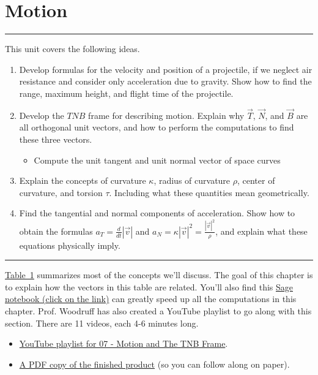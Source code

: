 \documentclass[10pt,]{book}
\theoremstyle{plain}
\theoremstyle{definition}
\theoremstyle{definition}
\theoremstyle{definition}
\theoremstyle{definition}
\newenvironment{objectives}[1]{\noindent\rule{\linewidth}{0.1ex}\newline{\textbf{{\large#1}}\par\smallskip}}{\par\noindent\rule{\linewidth}{0.1ex}\par\smallskip}
\theoremstyle{definition}
\numberwithin{equation}{section}
\newcommand{\sageurlforcurvature}{http://bmw.byuimath.com/dokuwiki/doku.php?id=curvature_calculator}
\begin{document}
\chapter[{Motion}]{Motion}\label{chapter-8}
\begin{objectives}{Objectives}\label{objectives-16}
This unit covers the following ideas.%
%
\begin{enumerate}
\item\hypertarget{li-105}{}Develop formulas for the velocity and position of a projectile, if we neglect air resistance and consider only acceleration due to gravity. Show how to find the range, maximum height, and flight time of the projectile.%
\item\hypertarget{li-106}{}Develop the \(TNB\) frame for describing motion. Explain why \(\vec T\), \(\vec N\), and \(\vec B\) are all orthogonal unit vectors, and how to perform the computations to find these three vectors. %
\begin{itemize}[label=\textbullet]
\item{}Compute the unit tangent and unit normal vector of space curves%
\end{itemize}
%
\item\hypertarget{li-108}{}Explain the concepts of curvature \(\kappa\), radius of curvature \(\rho\), center of curvature, and torsion \(\tau\). Including what these quantities mean geometrically.%
\item\hypertarget{li-109}{}Find the tangential and normal components of acceleration. Show how to obtain the formulas \(a_T=\frac{d}{dt}|\vec v|\) and \(a_N=\kappa |\vec v|^2=\frac{|\vec v|^2}{\rho}\), and explain what these equations physically imply.%
\end{enumerate}
\end{objectives}
\hyperref[motion_table]{Table~1} summarizes most of the concepts we'll discuss. The goal of this chapter is to explain how the vectors in this table are related. You'll also find this \href{\\sageurlforcurvature}{Sage notebook (click on the link)} can greatly speed up all the computations in this chapter. Prof. Woodruff has also created a YouTube playlist to go along with this section. There are 11 videos, each 4-6 minutes long. \leavevmode%
\begin{itemize}[label=\textbullet]
\item{}\href{http://www.youtube.com/playlist?list=PL30EE81142B1ED1F0\&feature=plcp}{YouTube playlist for 07 - Motion and The TNB Frame}.%
\item{}\href{http://db.tt/FmEGk9p5}{A PDF copy of the finished product} (so you can follow along on paper).%
\end{itemize}
\end{document}
